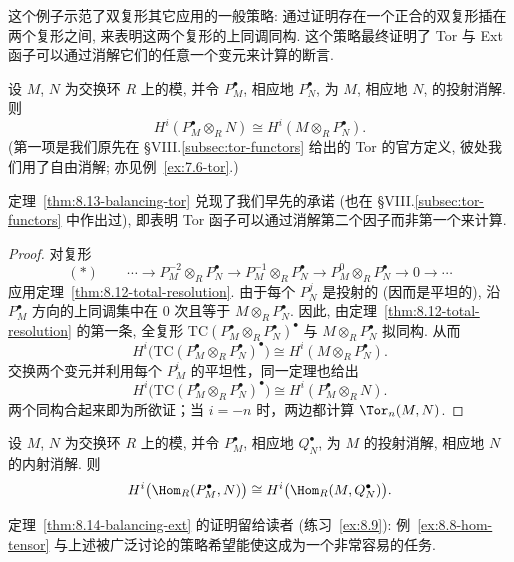 这个例子示范了双复形其它应用的一般策略: 通过证明存在一个正合的双复形插在两个复形之间, 来表明这两个复形的上同调同构. 这个策略最终证明了 Tor 与 Ext 函子可以通过消解它们的任意一个变元来计算的断言.

\begin{theorem}\label{thm:8.13-balancing-tor}
设 $M$, $N$ 为交换环 $R$ 上的模, 并令 $P_M^\bullet$, 相应地 $P_N^\bullet$, 为 $M$, 相应地 $N$, 的投射消解. 则
\[
H^i(P_M^\bullet\otimes_R N)\cong H^i(M\otimes_R P_N^\bullet).
\]
(第一项是我们原先在 §VIII.\ref{subsec:tor-functors} 给出的 Tor 的官方定义, 彼处我们用了自由消解; 亦见例~\ref{ex:7.6-tor}.)
\end{theorem}

定理~\ref{thm:8.13-balancing-tor} 兑现了我们早先的承诺 (也在 §VIII.\ref{subsec:tor-functors} 中作出过), 即表明 Tor 函子可以通过消解第二个因子而非第一个来计算.

\begin{proof}
对复形
\[
(*)\qquad \cdots \longrightarrow P_M^{-2}\otimes_R P_N^\bullet \longrightarrow P_M^{-1}\otimes_R P_N^\bullet \longrightarrow P_M^{0}\otimes_R P_N^\bullet \longrightarrow 0 \longrightarrow \cdots
\]
应用定理~\ref{thm:8.12-total-resolution}. 由于每个 $P_N^j$ 是投射的 (因而是平坦的), 沿 $P_M^\bullet$ 方向的上同调集中在 $0$ 次且等于 $M\otimes_R P_N^\bullet$. 因此, 由定理~\ref{thm:8.12-total-resolution} 的第一条, 全复形 $\mathrm{TC}(P_M^\bullet\otimes_R P_N^\bullet)^\bullet$ 与 $M\otimes_R P_N^\bullet$ 拟同构. 从而
\[
H^i\bigl(\mathrm{TC}(P_M^\bullet\otimes_R P_N^\bullet)^\bullet\bigr)\cong H^i(M\otimes_R P_N^\bullet).
\]
交换两个变元并利用每个 $P_M^i$ 的平坦性，同一定理也给出
\[
H^i\bigl(\mathrm{TC}(P_M^\bullet\otimes_R P_N^\bullet)^\bullet\bigr)\cong H^i(P_M^\bullet\otimes_R N).
\]
两个同构合起来即为所欲证；当 $i=-n$ 时，两边都计算 $\Tor_n(M,N)$.
\end{proof}

\begin{theorem}\label{thm:8.14-balancing-ext}
设 $M$, $N$ 为交换环 $R$ 上的模, 并令 $P_M^\bullet$, 相应地 $Q_N^\bullet$, 为 $M$ 的投射消解, 相应地 $N$ 的内射消解. 则
\[
H^i\bigl(\Hom_R(P_M^\bullet, N)\bigr)\cong H^i\bigl(\Hom_R(M, Q_N^\bullet)\bigr).
\]
\end{theorem}

定理~\ref{thm:8.14-balancing-ext} 的证明留给读者 (练习~\ref{ex:8.9}): 例~\ref{ex:8.8-hom-tensor} 与上述被广泛讨论的策略希望能使这成为一个非常容易的任务.

